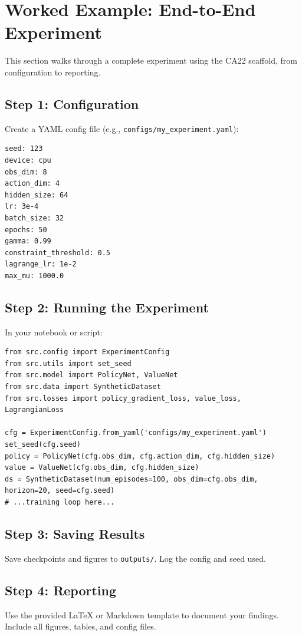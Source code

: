 \documentclass[11pt]{article}
\begin{document}
\section{Worked Example: End-to-End Experiment}
This section walks through a complete experiment using the CA22 scaffold, from configuration to reporting.

\subsection{Step 1: Configuration}
Create a YAML config file (e.g., \texttt{configs/my\_experiment.yaml}):
\begin{verbatim}
seed: 123
device: cpu
obs_dim: 8
action_dim: 4
hidden_size: 64
lr: 3e-4
batch_size: 32
epochs: 50
gamma: 0.99
constraint_threshold: 0.5
lagrange_lr: 1e-2
max_mu: 1000.0
\end{verbatim}

\subsection{Step 2: Running the Experiment}
In your notebook or script:
\begin{verbatim}
from src.config import ExperimentConfig
from src.utils import set_seed
from src.model import PolicyNet, ValueNet
from src.data import SyntheticDataset
from src.losses import policy_gradient_loss, value_loss, LagrangianLoss

cfg = ExperimentConfig.from_yaml('configs/my_experiment.yaml')
set_seed(cfg.seed)
policy = PolicyNet(cfg.obs_dim, cfg.action_dim, cfg.hidden_size)
value = ValueNet(cfg.obs_dim, cfg.hidden_size)
ds = SyntheticDataset(num_episodes=100, obs_dim=cfg.obs_dim, horizon=20, seed=cfg.seed)
# ...training loop here...
\end{verbatim}

\subsection{Step 3: Saving Results}
Save checkpoints and figures to \texttt{outputs/}. Log the config and seed used.

\subsection{Step 4: Reporting}
Use the provided LaTeX or Markdown template to document your findings. Include all figures, tables, and config files.
\end{document}
